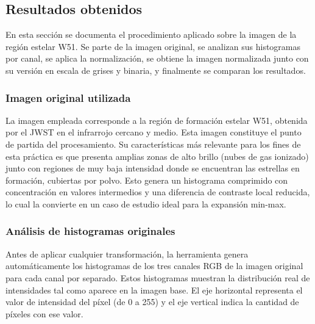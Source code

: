 \documentclass[11pt]{article}
\begin{document}
\subsection{Resultados obtenidos}

En esta sección se documenta el procedimiento aplicado sobre la imagen de la región estelar W51. Se parte de la imagen original, se analizan sus histogramas por canal, se aplica la normalización, se obtiene la imagen normalizada junto con su versión en escala de grises y binaria, y finalmente se comparan los resultados.

\subsubsection{Imagen original utilizada}

La imagen empleada corresponde a la región de formación estelar W51, obtenida por el JWST en el infrarrojo cercano y medio. Esta imagen constituye el punto de partida del procesamiento. Su características más relevante para los fines de esta práctica es que presenta amplias zonas de alto brillo (nubes de gas ionizado) junto con regiones de muy baja intensidad donde se encuentran las estrellas en formación, cubiertas por polvo. Esto genera un histograma comprimido con concentración en valores intermedios y una diferencia de contraste local reducida, lo cual la convierte en un caso de estudio ideal para la expansión min-max.


\subsubsection{Análisis de histogramas originales}

Antes de aplicar cualquier transformación, la herramienta genera automáticamente los histogramas de los tres canales RGB de la imagen original para cada canal por separado. Estos histogramas muestran la distribución real de intensidades tal como aparece en la imagen base. El eje horizontal representa el valor de intensidad del píxel (de 0 a 255) y el eje vertical indica la cantidad de píxeles con ese valor.

\end{document}
